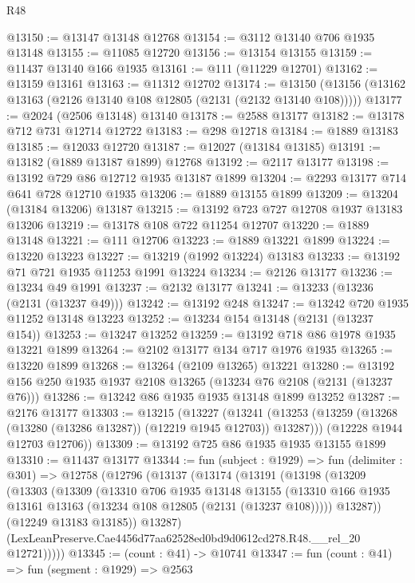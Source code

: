 \begin{lexlean}{R48}
\begin{coremodule}
@13150 := @13147 @13148 @12768
@13154 := @3112 @13140 @706 @1935 @13148
@13155 := @11085 @12720
@13156 := @13154 @13155
@13159 := @11437 @13140 @166 @1935
@13161 := @111 (@11229 @12701)
@13162 := @13159 @13161
@13163 := @11312 @12702
@13174 := @13150 (@13156 (@13162 @13163 (@2126 @13140 @108 @12805 (@2131 (@2132 @13140 @108)))))
@13177 := @2024 (@2506 @13148) @13140
@13178 := @2588 @13177
@13182 := @13178 @712 @731 @12714 @12722
@13183 := @298 @12718
@13184 := @1889 @13183
@13185 := @12033 @12720
@13187 := @12027 (@13184 @13185)
@13191 := @13182 (@1889 @13187 @1899) @12768
@13192 := @2117 @13177
@13198 := @13192 @729 @86 @12712 @1935 @13187 @1899
@13204 := @2293 @13177 @714 @641 @728 @12710 @1935
@13206 := @1889 @13155 @1899
@13209 := @13204 (@13184 @13206) @13187
@13215 := @13192 @723 @727 @12708 @1937 @13183 @13206
@13219 := @13178 @108 @722 @11254 @12707
@13220 := @1889 @13148
@13221 := @111 @12706
@13223 := @1889 @13221 @1899
@13224 := @13220 @13223
@13227 := @13219 (@1992 @13224) @13183
@13233 := @13192 @71 @721 @1935 @11253 @1991 @13224
@13234 := @2126 @13177
@13236 := @13234 @49 @1991
@13237 := @2132 @13177
@13241 := @13233 (@13236 (@2131 (@13237 @49)))
@13242 := @13192 @248
@13247 := @13242 @720 @1935 @11252 @13148 @13223
@13252 := @13234 @154 @13148 (@2131 (@13237 @154))
@13253 := @13247 @13252
@13259 := @13192 @718 @86 @1978 @1935 @13221 @1899
@13264 := @2102 @13177 @134 @717 @1976 @1935
@13265 := @13220 @1899
@13268 := @13264 (@2109 @13265) @13221
@13280 := @13192 @156 @250 @1935 @1937 @2108 @13265 (@13234 @76 @2108 (@2131 (@13237 @76)))
@13286 := @13242 @86 @1935 @1935 @13148 @1899 @13252
@13287 := @2176 @13177
@13303 := @13215
    (@13227
      (@13241 (@13253 (@13259 (@13268 (@13280 (@13286 @13287)) (@12219 @1945 @12703)) @13287)))
      (@12228 @1944 @12703 @12706))
@13309 := @13192 @725 @86 @1935 @1935 @13155 @1899
@13310 := @11437 @13177
@13344 := fun (subject : @1929) =>
  fun (delimiter : @301) =>
  @12758
    (@12796
      (@13137
        (@13174
          (@13191
            (@13198
              (@13209
                (@13303
                  (@13309
                    (@13310
                      @706
                      @1935
                      @13148
                      @13155
                      (@13310 @166 @1935 @13161 @13163 (@13234 @108 @12805 (@2131 (@13237 @108)))))
                    @13287))
                (@12249 @13183 @13185))
              @13287)
            (LexLeanPreserve.Cae4456d77aa62528ed0bd9d0612cd278.R48.__rel_20 @12721)))))
@13345 := (count : @41) -> @10741
@13347 := fun (count : @41) => fun (segment : @1929) => @2563

\end{coremodule}
\end{lexlean}
